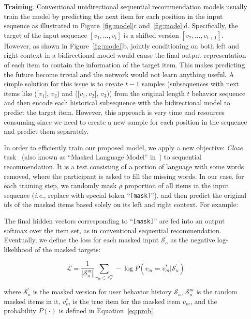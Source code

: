 \textbf{Training}. 
Conventional unidirectional sequential recommendation models usually train the model by predicting the next item for each position in the input sequence as illustrated in Figure~\ref{fig:model}c and~\ref{fig:model}d.
Specifically, the target of the input sequence $[v_1,\dots,v_{t}]$ is a shifted version $[v_2,\dots,v_{t+1}]$.
However, as shown in Figure~\ref{fig:model}b, jointly conditioning on both left and right context in a bidirectional model would cause the final output representation of each item to contain the information of the target item. This makes predicting the future become trivial and the network would not learn anything useful. A simple solution for this issue is to create $t-1$ samples (subsequences with next items like ([$v_1$], $v_2$) and ([$v_1,v_2$], $v_3$)) from the original length $t$ behavior sequence and then encode each historical subsequence with the bidirectional model to predict the target item. However, this approach is very time and resources consuming since we need to create a new sample for each position in the sequence and predict them separately.

In order to efficiently train our proposed model, we apply a new objective: \textit{Cloze} task~\cite{Wilson:Cloze} (also known as ``Masked Language Model'' in~\cite{Devlin:2018:BERT}) to sequential recommendation. It is a test consisting of a portion of language with some words removed, where the participant is asked to fill the missing words. In our case, for each training step, we randomly mask $\rho$ proportion of all items in the input sequence (\textit{i.e.}, replace with special token ``\texttt{[mask]}''), and then predict the original ids of the masked items based solely on its left and right context. For example: 

 The final hidden vectors corresponding to ``\texttt{[mask]}'' are fed into an output softmax over the item set, as in conventional sequential recommendation. Eventually, we define the loss for each masked input $\mathcal{S}_u^{\prime}$ as the negative log-likelihood of the masked targets:

\begin{equation}
    \mathcal{L} = \frac{1}{|\mathcal{S}_u^m|} \sum_{v_m\in \mathcal{S}_u^m} -\log P(v_m=v_m^{*}|\mathcal{S}_u^{\prime} )
    \label{eq:loss}
\end{equation}

where $\mathcal{S}_u^{\prime}$ is the masked version for user behavior history $\mathcal{S}_u$, $\mathcal{S}_u^m$ is the random masked items in it, $v_m^*$ is the true item for the masked item $v_m$, and the probability $P(\cdot)$ is defined in Equation~\ref{eq:prob}.

